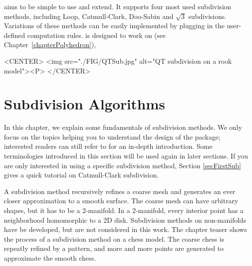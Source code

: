
 aims to be simple to use and extend.
It supports four most used subdivision methods, including Loop, 
Catmull-Clark, Doo-Sabin and $\sqrt{3}$ subdivisions. Variations 
of these methods can be easily implemented by plugging 
in the user-defined computation rules. 
is designed to work on  
(see Chapter~\ref{chapterPolyhedron}), 


\begin{ccHtmlOnly}
     <CENTER>
         <img src="./FIG/QTSub.jpg" alt="QT subdivision on a rook model"><P>
     </CENTER>
\end{ccHtmlOnly}

\section{Subdivision Algorithms}
\label{secSubAlgo}
In this chapter, we explain some fundamentals of 
subdivision methods. We only focus on the topics helping you 
to understand the design of the package; interested readers can
still refer to \cite{cgal:ww-smgd-02} for an in-depth introduction.
Some terminologies introduced in this section will be used again
in later sections. If you are only interested in using a 
specific subdivision method, Section \ref{secFirstSub} 
gives a quick tutorial on Catmull-Clark subdivision.

A subdivision method recursively refines a coarse mesh and 
generates an ever closer approximation to a smooth surface.
The coarse mesh can have arbitrary shapes, but it has to 
be a 2-manifold. In a 2-manifold, every interior point has 
a neighborhood homomorphic to a 2D disk. Subdivision methods
on non-manifolds have be developed, but are not considered
in this work. 
The chapter teaser shows the process of a subdivision method on 
a chess model. The coarse chess is repeatly refined by a pattern, 
and more and more points are generated to approximate the 
smooth chess.

